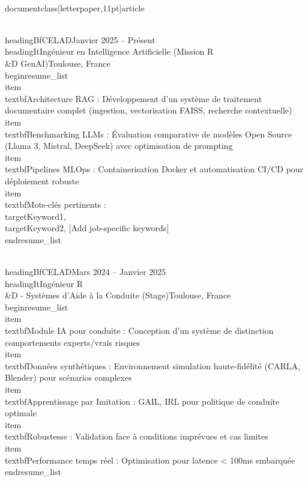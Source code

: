 \\documentclass[letterpaper,11pt]{article}
\begin{document}
\\headingBf{CELAD}{Janvier 2025 -- Présent}
\\headingIt{Ingénieur en Intelligence Artificielle (Mission R\\&D GenAI)}{Toulouse, France}
\\begin{resume_list}
  \\item \\textbf{Architecture RAG :} Développement d'un système de traitement documentaire complet (ingestion, vectorisation FAISS, recherche contextuelle)
  \\item \\textbf{Benchmarking LLMs :} Évaluation comparative de modèles Open Source (Llama 3, Mistral, DeepSeek) avec optimisation de prompting
  \\item \\textbf{Pipelines MLOps :} Containerisation Docker et automatisation CI/CD pour déploiement robuste
  \\item \\textbf{Mots-clés pertinents :} \\targetKeyword1, \\targetKeyword2, [Add job-specific keywords]
\\end{resume_list}

\\headingBf{CELAD}{Mars 2024 -- Janvier 2025}
\\headingIt{Ingénieur R\\&D - Systèmes d'Aide à la Conduite (Stage)}{Toulouse, France}
\\begin{resume_list}
  \\item \\textbf{Module IA pour conduite :} Conception d'un système de distinction comportements experts/vrais risques
  \\item \\textbf{Données synthétiques :} Environnement simulation haute-fidélité (CARLA, Blender) pour scénarios complexes
  \\item \\textbf{Apprentissage par Imitation :} GAIL, IRL pour politique de conduite optimale
  \\item \\textbf{Robustesse :} Validation face à conditions imprévues et cas limites
  \\item \\textbf{Performance temps réel :} Optimisation pour latence < 100ms embarquée
\\end{resume_list}
\end{document}
